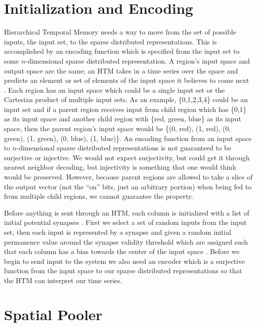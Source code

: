 \documentclass[oneside,12pt,openany]{book}
\begin{document}
	\section{Initialization and Encoding}
	
	Hierarchical Temporal Memory needs a way to move from the set of possible inputs, the input set, to the sparse distributed representations. This is accomplished by an encoding function which is specified from the input set to some $n$-dimensional sparse distributed representation. A region's input space and output space are the same; an HTM takes in a time series over the space and predicts an element or set of elements of the input space it believes to come next \cite{Purdy}. Each region has an input space which could be a single input set or the Cartesian product of multiple input sets. As an example, \{0,1,2,3,4\} could be an input set and if a parent region receives input from child region which has \{0,1\} as its input space and another child region with \{red, green, blue\} as its input space, then the parent region's input space would be \{(0, red), (1, red), (0, green), (1, green), (0, blue), (1, blue)\}. An encoding function from an input space to $n$-dimensional sparse distributed representations is not guaranteed to be surjective or injective. We would not expect surjectivity, but could get it through nearest neighbor decoding, but injectivity is something that one would think would be preserved. However, because parent regions are allowed to take a slice of the output vector (not the ``on'' bits, just an arbitrary portion) when being fed to from multiple child regions, we cannot guarantee the property.
	
	Before anything is sent through an HTM, each column is initialized with a list of initial potential synapses \cite{Whitepaper}. First we select a set of random inputs from the input set, then each input is represented by a synapse and given a random initial permanence value around the synapse validity threshold which are assigned such that each column has a bias towards the center of the input space \cite{Whitepaper}. Before we begin to send input to the system we also need an encoder which is a surjective function from the input space to our sparse distributed representations so that the HTM can interpret our time series.
	
	\section{Spatial Pooler}
	
\end{document}
